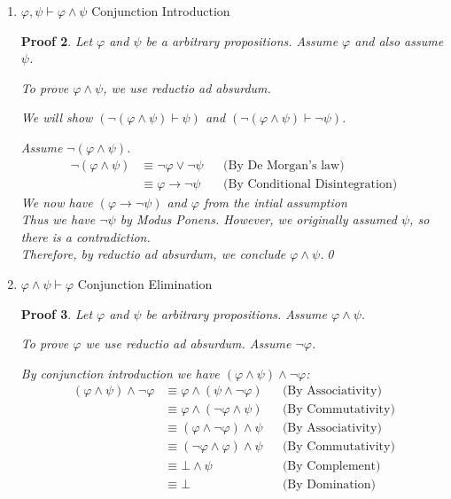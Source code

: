 \documentclass[12pt]{article}
\newcommand{\T}{\top}
\theoremstyle{proofstyle}
\newtheorem*{proof*}{Proof}
\begin{document}
\begin{enumerate}[left=0pt, itemsep=2em, parsep=1em]
\begin{enumerate}[label=(\alph*), itemsep=1.5em, leftmargin=2em]
\begin{proof*}
    From part 1(a) $\varphi \to \varphi \equiv \T $
    
    Therefore, we have $\top$. \qed
\end{proof*}


\item $\varphi, \psi \vdash \varphi \wedge \psi$ \hfill Conjunction Introduction

\begin{proof*}
    Let $\varphi$ and $\psi$ be a arbitrary propositions. Assume $\varphi$ and also assume $\psi$.
    
    To prove $\varphi \land \psi$, we use reductio ad absurdum. 
    
    We will show $(\neg(\varphi \land \psi) \vdash \psi)$ and $(\neg(\varphi \land \psi) \vdash \neg\psi)$.
    
    Assume $\neg(\varphi \land \psi)$.
    \begin{align*}
        \neg(\varphi \land \psi) &\equiv \neg\varphi \lor \neg\psi && \text{(By De Morgan's law)} \\
        &\equiv \varphi \to \neg\psi && \text{(By Conditional Disintegration)}
    \end{align*}
        We now have $(\varphi \to \neg\psi)$ and $\varphi$ from the intial assumption \\
        Thus we have $\neg\psi$ by Modus Ponens. However, we originally assumed $\psi$, so there is a contradiction. \\    
    Therefore, by reductio ad absurdum, we conclude $\varphi \land \psi$.\qed
\end{proof*}

\newpage
\item $\varphi \wedge \psi \vdash \varphi$ \hfill Conjunction Elimination

\begin{proof*}
    Let $\varphi$ and $\psi$ be arbitrary propositions. Assume $\varphi \land \psi$.
    
    To prove $\varphi$ we use reductio ad absurdum. Assume $\neg\varphi$.
    
    By conjunction introduction we have $(\varphi \land \psi) \land \neg\varphi$:
    \begin{align*}
        (\varphi \land \psi) \land \neg\varphi &\equiv \varphi \land (\psi \land \neg\varphi) && \text{(By Associativity)} \\
        &\equiv \varphi \land (\neg\varphi \land \psi) && \text{(By Commutativity)} \\
        &\equiv (\varphi \land \neg\varphi) \land \psi && \text{(By Associativity)} \\
        &\equiv (\neg \varphi \land \varphi) \land \psi && \text{(By Commutativity)} \\
        &\equiv \bot \land \psi && \text{(By Complement)} \\
        &\equiv \bot && \text{(By Domination)}
    \end{align*}
    

\end{proof*}
\end{enumerate}
\end{enumerate}
\end{document}
